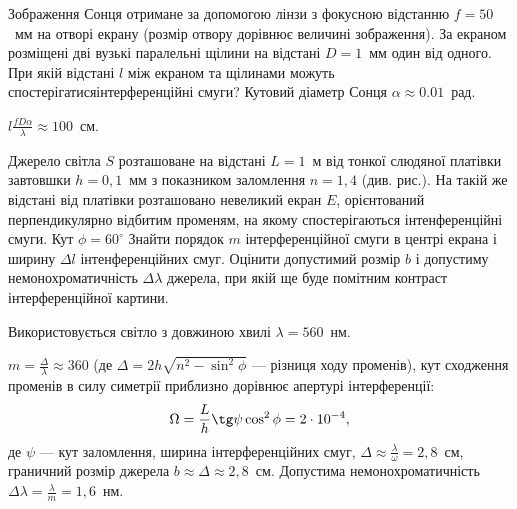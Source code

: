 \begin{problem}%
Зображення Сонця отримане за допомогою лінзи з фокусною
відстанню $ f = 50 $~мм на отворі екрану (розмір отвору дорівнює величині
зображення). За екраном розміщені дві вузькі паралельні щілини на
відстані $ D = 1 $~мм один від одного. При якій відстані $ l $ між екраном та
щілинами можуть спостерігатисяінтерференційні смуги? Кутовий
діаметр Сонця $ \alpha \approx 0.01 $~рад.
\begin{solution}
	$ l \frac{fD\alpha}{\lambda} \approx 100$~см.
\end{solution}
\end{problem}


\begin{problem}%
Джерело світла $ S $ розташоване на відстані $ L = 1 $~м від тонкої слюдяної
платівки завтовшки $ h = 0,1 $~мм з показником заломлення $ n = 1,4 $ (див.
рис.). На такій же відстані від платівки розташовано невеликий
екран $ E $, орієнтований перпендикулярно відбитим променям, на якому
спостерігаються інтенференційні смуги. Кут $ \phi = 60^\circ $ Знайти порядок $ m $
інтерференційної смуги в центрі екрана і ширину $ \Delta l $ інтенференційних
смуг. Оцінити допустимий розмір $ b $ і допустиму немонохроматичність
$ \Delta\lambda $ джерела, при якій ще буде помітним контраст інтерференційної
картини.

\begin{center}
	
\end{center}


Використовується світло з довжиною хвилі $ \lambda = 560 $~нм.
\begin{solution}
	$m = \frac{\Delta}{\lambda} \approx 360$ (де $\Delta = 2h\sqrt{n^2 - \sin^2\phi}$ --- різниця ходу променів), кут сходження променів в силу симетрії приблизно дорівнює апертурі інтерференції:
	\begin{equation*}
		\Omega = \frac{L}{h} \tg\psi\cos^2\phi = 2\cdot10^{-4},
	\end{equation*}
	де $\psi$ --- кут заломлення, ширина інтерференційних смуг, $\Delta \approx \frac{\lambda}{\omega} = 2,8$~см, граничний розмір джерела $b \approx \Delta \approx 2,8$~см. Допустима немонохроматичність
	$ \Delta\lambda =  \frac{\lambda}{m} = 1,6 $~нм.
\end{solution}
\end{problem}



